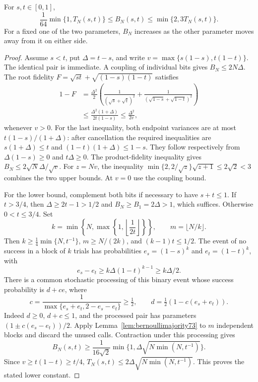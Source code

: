 \begin{lemma}
\label{lem:bernoulliproduct75}
For $s,t\in[0,1]$,
\begin{equation}\label{eq:bernoulliproduct75}
 \frac1{64}\min\{1,T_N(s,t)\}
       \le B_N(s,t)\le\min\{2,3T_N(s,t)\}.
\end{equation}
For a fixed one of the two parameters, $B_N$ increases as the other
parameter moves away from it on either side.
\end{lemma}
\begin{proof}
Assume $s<t$, put $\Delta=t-s$, and write
$v=\max\{s(1-s),t(1-t)\}$.  The identical pair is immediate.
A coupling of individual bits gives $B_N\le2N\Delta$.
The root fidelity $F=\sqrt{st}+\sqrt{(1-s)(1-t)}$ satisfies
\begin{align*}
 1-F
 &=\frac{\Delta^2}{2}
       \left(\frac1{(\sqrt s+\sqrt t)^2}
            +\frac1{(\sqrt{1-s}+\sqrt{1-t})^2}\right)\\
 &\le\frac{\Delta^2(1+\Delta)}{2t(1-s)}
 \le\frac{\Delta^2}{2v},
\end{align*}
whenever $v>0$.  For the last inequality, both endpoint variances
are at most $t(1-s)/(1+\Delta)$: after cancellation the required
inequalities are $s(1+\Delta)\le t$ and
$(1-t)(1+\Delta)\le1-s$.  They follow respectively from
$\Delta(1-s)\ge0$ and $t\Delta\ge0$.
The product-fidelity inequality gives
$B_N\le2\sqrt N\Delta/\sqrt v$.
For $z=Nv$, the inequality
$\min\{2,2/\sqrt z\}\sqrt{z+1}\le2\sqrt2<3$
combines the two upper bounds.  At $v=0$ use the coupling bound.

For the lower bound, complement both bits if necessary to have
$s+t\le1$.  If $t>3/4$, then $\Delta\ge2t-1>1/2$ and
$B_N\ge B_1=2\Delta>1$, which suffices.  Otherwise $0<t\le3/4$.
Set
\[
 k=\min\left\{N,\max\left\{1,
                           \left\lfloor\frac1{2t}\right\rfloor
                              \right\}\right\},\qquad
 m=\lfloor N/k\rfloor.
\]
Then $k\ge\frac14\min\{N,t^{-1}\}$, $m\ge N/(2k)$, and
$(k-1)t\le1/2$.  The event of no success in a block of $k$ trials
has probabilities $e_s=(1-s)^k$ and $e_t=(1-t)^k$, with
\[
 e_s-e_t\ge k\Delta(1-t)^{k-1}\ge k\Delta/2.
\]
There is a common stochastic processing of this binary event whose
success probability is $d+ce$, where
\[
 c=\frac1{\max\{e_s+e_t,2-e_s-e_t\}}\ge\tfrac12,
 \qquad d=\tfrac12(1-c(e_s+e_t)).
\]
Indeed $d\ge0$, $d+c\le1$, and the processed pair has parameters
$(1\pm c(e_s-e_t))/2$.  Apply
Lemma~\ref{lem:bernoullimajority73} to $m$ independent blocks and
discard the unused calls.  Contraction under this processing gives
\[
 B_N(s,t)\ge\frac1{16\sqrt2}
       \min\{1,\Delta\sqrt{N\min(N,t^{-1})}\}.
\]
Since $v\ge t(1-t)\ge t/4$,
$T_N(s,t)\le2\Delta\sqrt{N\min(N,t^{-1})}$.
This proves the stated lower constant.


\end{proof}
